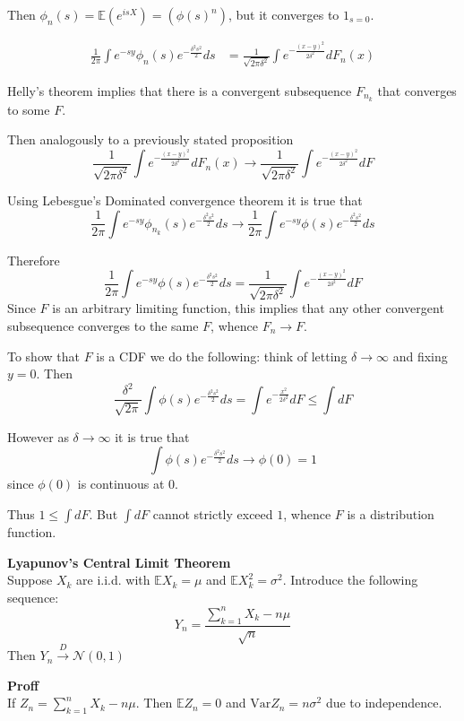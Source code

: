\documentclass[a4paper]{article}
\newcommand{\brac}[1]{{\left ( #1 \right )}}
\newcommand{\Ex}{\mathbb{E}}
\newcommand{\Var}{\text{Var}}
\begin{document}
Then $\phi_n(s) = \Ex\brac{e^{isX}} = \brac{\phi(s)^n}$, but it converges to $1_{s=0}$.


\begin{align*}
	\frac{1}{2\pi}\int e^{-sy} \phi_n(s) e^{-\frac{\delta^2 s^2}{2}}ds
	& = \frac{1}{\sqrt{2\pi\delta^2}}\int e^{-\frac{{(x-y)}^2}{2\delta^2}}dF_n(x)
\end{align*}

Helly's theorem implies that there is a convergent subsequence $F_{n_k}$ that converges to some $F$.

Then analogously to a previously stated proposition
\[\frac{1}{\sqrt{2\pi\delta^2}}\int e^{-\frac{{(x-y)}^2}{2\delta^2}}dF_n(x) \to \frac{1}{\sqrt{2\pi\delta^2}}\int e^{-\frac{{(x-y)}^2}{2\delta^2}}dF\]

Using Lebesgue's Dominated convergence theorem it is true that
\[\frac{1}{2\pi}\int e^{-sy} \phi_{n_k}(s) e^{-\frac{\delta^2 s^2}{2}}ds \to \frac{1}{2\pi}\int e^{-sy} \phi(s) e^{-\frac{\delta^2 s^2}{2}}ds\]

Therefore
\[\frac{1}{2\pi}\int e^{-sy} \phi(s) e^{-\frac{\delta^2 s^2}{2}}ds = \frac{1}{\sqrt{2\pi\delta^2}}\int e^{-\frac{{(x-y)}^2}{2\delta^2}}dF\]
Since $F$ is an arbitrary limiting function, this implies that any other convergent subsequence converges to the same $F$, whence $F_n\to F$.

To show that $F$ is a CDF we do the following: think of letting $\delta\to \infty$ and fixing $y=0$. Then
\[\frac{\delta^2}{\sqrt{2\pi}}\int \phi(s) e^{-\frac{\delta^2 s^2}{2}}ds = \int e^{-\frac{x^2}{2\delta^2}}dF \leq \int dF\]

However as $\delta\to\infty$ it is true that
\[\int \phi(s) e^{-\frac{\delta^2 s^2}{2}}ds\to \phi(0) = 1\]
since $\phi(0)$ is continuous at $0$.

Thus $1 \leq \int dF$. But $\int dF$ cannot strictly exceed $1$, whence $F$ is a distribution function.

\noindent\textbf{Lyapunov's Central Limit Theorem} \hfill\\
Suppose $X_k$ are i.i.d. with $\Ex X_k = \mu$ and $\Ex X_k^2 = \sigma^2$. Introduce the following sequence:
\[Y_n = \frac{\sum_{k=1}^n X_k - n \mu }{\sqrt{n}}\]
Then $Y_n\overset{D}{\to}\mathcal{N}(0,1)$

\textbf{Proff}\hfill\\

If $Z_n = \sum_{k=1}^n X_k - n\mu$. Then $\Ex Z_n = 0$ and $\Var Z_n = n \sigma^2$ due to independence.
\end{document}
